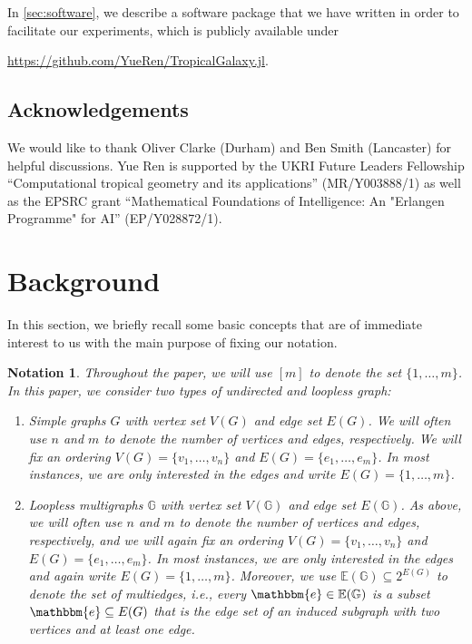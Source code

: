 \documentclass[11pt,reqno,a4paper]{amsart}
\theoremstyle{theoremstyle}
\theoremstyle{examplestyle}
\newtheorem{notation}[theorem]{Notation}
\theoremstyle{algorithmstyle}
\newcommand{\EE}{\mathbb{E}}
\newcommand{\ee}{\mathbbm{e}}
\newcommand{\GG}{\mathbb{G}}
\begin{document}
In \cref{sec:software}, we describe a software package that we have written in order to facilitate our experiments, which is publicly available under
\begin{center}
    \url{https://github.com/YueRen/TropicalGalaxy.jl}.
\end{center}



\subsection*{Acknowledgements}
We would like to thank Oliver Clarke (Durham) and Ben Smith (Lancaster) for helpful discussions.  Yue Ren is supported by the UKRI Future Leaders Fellowship ``Computational tropical geometry and its applications'' (MR/Y003888/1) as well as the EPSRC grant ``Mathematical Foundations of Intelligence: An "Erlangen Programme" for AI'' (EP/Y028872/1).

\section{Background}\label{sec:background}
In this section, we briefly recall some basic concepts that are of immediate interest to us with the main purpose of fixing our notation.

\begin{notation}
  \label{not:graphs}
  Throughout the paper, we will use $[m]$ to denote the set $\{1,\dots,m\}$.
  In this paper, we consider two types of undirected and loopless graph:

  \begin{enumerate}[leftmargin=*]
  \item Simple graphs $G$ with vertex set $V(G)$ and edge set $E(G)$.  We will often use $n$ and $m$ to denote the number of vertices and edges, respectively.  We will fix an ordering $V(G)=\{v_1, \dots, v_n\}$ and $E(G)=\{e_1, \dots, e_m\}$.  In most instances, we are only interested in the edges and write $E(G)=\{1, \dots, m\}$.

  \item Loopless multigraphs $\GG$ with vertex set $V(\GG)$ and edge set $E(\GG)$.  As above, we will often use $n$ and $m$ to denote the number of vertices and edges, respectively, and we will again fix an ordering $V(G)=\{v_1, \dots, v_n\}$ and $E(G)=\{e_1, \dots, e_m\}$.  In most instances, we are only interested in the edges and again write $E(G)=\{1, \dots, m\}$.
  Moreover, we use $\EE(\GG)\subseteq 2^{E(G)}$ to denote the set of multiedges, i.e., every $\ee\in \EE(\GG)$ is a subset $\ee\subseteq E(G)$ that is the edge set of an induced subgraph with two vertices and at least one edge.
  \end{enumerate}
\end{notation}
\end{document}
